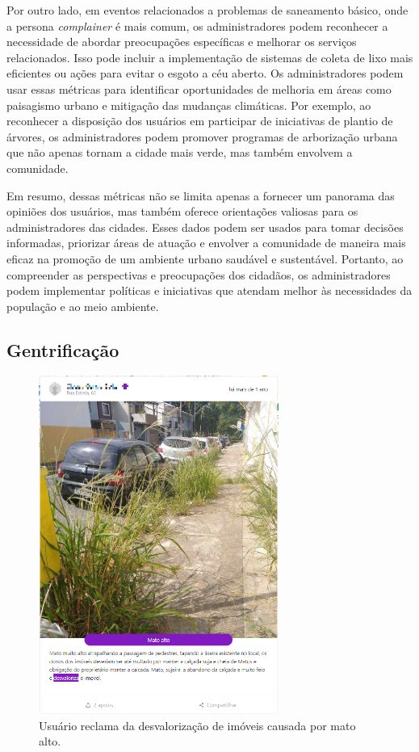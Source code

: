 Por outro lado, em eventos relacionados a problemas de saneamento básico, onde a persona \textit{complainer} é mais comum, os administradores podem reconhecer a necessidade de abordar preocupações específicas e melhorar os serviços relacionados. Isso pode incluir a implementação de sistemas de coleta de lixo mais eficientes ou ações para evitar o esgoto a céu aberto. Os administradores podem usar essas métricas para identificar oportunidades de melhoria em áreas como paisagismo urbano e mitigação das mudanças climáticas. Por exemplo, ao reconhecer a disposição dos usuários em participar de iniciativas de plantio de árvores, os administradores podem promover programas de arborização urbana que não apenas tornam a cidade mais verde, mas também envolvem a comunidade.

Em resumo, dessas métricas não se limita apenas a fornecer um panorama das opiniões dos usuários, mas também oferece orientações valiosas para os administradores das cidades. Esses dados podem ser usados para tomar decisões informadas, priorizar áreas de atuação e envolver a comunidade de maneira mais eficaz na promoção de um ambiente urbano saudável e sustentável. Portanto, ao compreender as perspectivas e preocupações dos cidadãos, os administradores podem implementar políticas e iniciativas que atendam melhor às necessidades da população e ao meio ambiente.

\subsection{Gentrificação}

\begin{figure}[htb]
	\centering
	\includegraphics[width=0.7\textwidth]{images/colab_posts_social_gentrification.png}
	\caption{Usuário reclama da desvalorização de imóveis causada por mato alto.}
	\label{fig:colab_posts_social_gentrification}
\end{figure}

